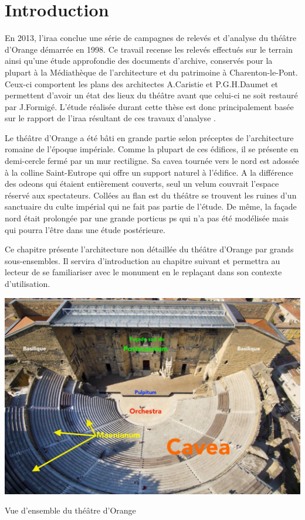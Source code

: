 		\section*{Introduction}
		
		En 2013, l'\gls{iraa} conclue une série de campagnes de relevés et d'analyse du théâtre d'Orange démarrée en 1998. Ce travail recense les relevés effectués sur le terrain ainsi qu'une étude approfondie des documents d'archive, conservés pour la plupart à la Médiathèque de l'architecture et du patrimoine à Charenton-le-Pont. Ceux-ci comportent les plans des architectes A.Caristie et P.G.H.Daumet et permettent d'avoir un état des lieux du théâtre avant que celui-ci ne soit restauré par J.Formigé. L'étude réalisée durant cette thèse est donc principalement basée sur le rapport de l'\gls{iraa} résultant de ces travaux d'analyse \cite{orangeTxt}\cite{orangePl}.
		
		Le théâtre d'Orange a été bâti en grande partie selon préceptes de l'architecture romaine de l'époque impériale. Comme la plupart de ces édifices, il se présente en demi-cercle fermé par un mur rectiligne. Sa \gls{cavea} tournée vers le nord est adossée à la colline Saint-Eutrope qui offre un support naturel à l'édifice. A la différence des \glspl{odeon} qui étaient entièrement couverts, seul un \gls{velum} couvrait l'espace réservé aux spectateurs. Collées au flan est du théâtre se trouvent les ruines d'un sanctuaire du culte impérial qui ne fait pas partie de l'étude. De même, la façade nord était prolongée par une grande \gls{porticus ps} qui n'a pas été modélisée mais qui pourra l'être dans une étude postérieure. 
		
		Ce chapitre présente l'architecture non détaillée du théâtre d'Orange par grands sous-ensembles. Il servira d'introduction au chapitre suivant et permettra au lecteur de se familiariser avec le monument en le replaçant dans son contexte d'utilisation.

	\begin{figureth}
			\includegraphics[width=\linewidth]{images/vuensemble}
			\caption[Vue d'ensemble du théâtre d'Orange]{Vue d'ensemble du théâtre d'Orange \footnotemark}
	\end{figureth}

